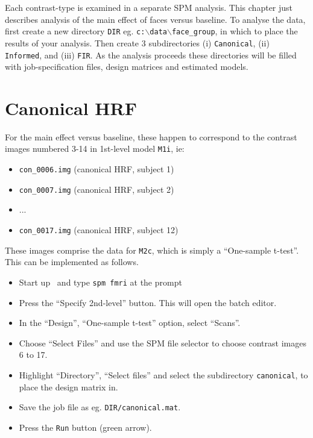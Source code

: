 Each contrast-type is examined in a separate SPM analysis. This chapter just describes analysis of the main effect of faces versus baseline.
To analyse the data, first create a new directory \texttt{DIR} eg. \texttt{c:$\backslash$data$\backslash$face\_group}, in which to place the results of your analysis. Then create 3 subdirectories (i) \texttt{Canonical}, (ii) \texttt{Informed}, and (iii) \texttt{FIR}. 
As the analysis proceeds these directories will be filled with job-specification files, design matrices and estimated models.

\section{Canonical HRF}

For the main effect versus baseline, these happen to correspond to the contrast images numbered 3-14 in 1st-level model \texttt{M1i}, ie:

\begin{itemize}
\item \texttt{con\_0006.img}       (canonical HRF, subject 1)
\item \texttt{con\_0007.img}       (canonical HRF, subject 2)
\item ...
\item \texttt{con\_0017.img}       (canonical HRF, subject 12)
\end{itemize}
These images comprise the data for \texttt{M2c}, which is simply a ``One-sample t-test''. This can be implemented as follows.
\begin{itemize}
\item Start up \matlab\ and type \texttt{spm fmri} at the prompt
\item Press the ``Specify 2nd-level'' button. This will open the batch editor.
\item In the ``Design'', ``One-sample t-test'' option, select ``Scans''.
\item Choose ``Select Files'' and use the SPM file selector to choose contrast images 6 to 17.
\item Highlight ``Directory'', ``Select files'' and select the  subdirectory \texttt{canonical}, to place the design matrix in.
\item Save the job file as eg. \texttt{DIR/canonical.mat}.
\item Press the \texttt{Run} button (green arrow).
\end{itemize}

